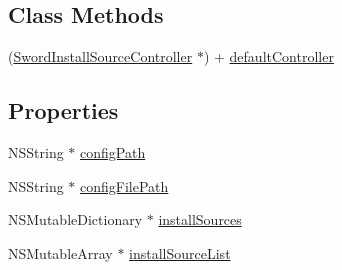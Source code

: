 \subsection*{Class Methods}
\begin{DoxyCompactItemize}
\item 
(\hyperlink{interface_sword_install_source_controller}{Sword\-Install\-Source\-Controller} $\ast$) + \hyperlink{interface_sword_install_source_controller_ad91c60ea8ac4a1b80466a6048ceffd79}{default\-Controller}
\end{DoxyCompactItemize}
\subsection*{Properties}
\begin{DoxyCompactItemize}
\item 
N\-S\-String $\ast$ \hyperlink{interface_sword_install_source_controller_af8b3f30b6c3f4595b757aa47d85b2b34}{config\-Path}
\item 
N\-S\-String $\ast$ \hyperlink{interface_sword_install_source_controller_a001267c1b513311fb775043643a39564}{config\-File\-Path}
\item 
N\-S\-Mutable\-Dictionary $\ast$ \hyperlink{interface_sword_install_source_controller_ab323d28629b6cfc7b2a4569c687a7bde}{install\-Sources}
\item 
N\-S\-Mutable\-Array $\ast$ \hyperlink{interface_sword_install_source_controller_ad14f2d05f83cbfc9485a8a83a0005401}{install\-Source\-List}
\end{DoxyCompactItemize}



